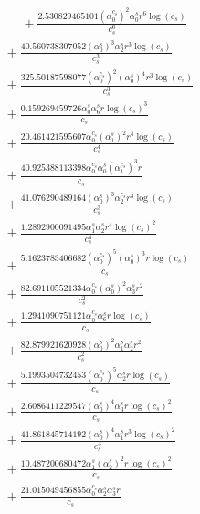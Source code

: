 \documentclass[10pt]{article}
\begin{document}
\begin{align*}
\phantom{R_{3,9}} &\phantom{={}}{}  + \frac{2.530829465101 \left(\alpha_{0}^{c_s}\right)^{2} \alpha_{0}^s r^{6} \log{\left(c_{s} \right)}}{c_{s}^{6}} \\
&{}  + \frac{40.560738307052 \left(\alpha_{0}^s\right)^{3} \alpha_{2}^s r^{3} \log{\left(c_{s} \right)}}{c_{s}^{3}} \\
&{}  + \frac{325.50187598077 \left(\alpha_{0}^{c_s}\right)^{2} \left(\alpha_{0}^s\right)^{4} r^{3} \log{\left(c_{s} \right)}}{c_{s}^{3}} \\
&{}  + \frac{0.159269459726 \alpha_{0}^s \alpha_{6}^s r \log{\left(c_{s} \right)}^{3}}{c_{s}} \\
&{}  + \frac{20.461421595607 \alpha_{0}^{c_s} \left(\alpha_{1}^s\right)^{2} r^{4} \log{\left(c_{s} \right)}}{c_{s}^{4}} \\
&{}  + \frac{40.925388113398 \alpha_{0}^{c_s} \alpha_{0}^s \left(\alpha_{1}^{c_s}\right)^{3} r}{c_{s}} \\
&{}  + \frac{41.076290489164 \left(\alpha_{0}^s\right)^{3} \alpha_{2}^{c_s} r^{3} \log{\left(c_{s} \right)}}{c_{s}^{3}} \\
&{}  + \frac{1.2892900091495 \alpha_{1}^s \alpha_{2}^s r^{4} \log{\left(c_{s} \right)}^{2}}{c_{s}^{4}} \\
&{}  + \frac{5.1623783406682 \left(\alpha_{0}^{c_s}\right)^{5} \left(\alpha_{0}^s\right)^{3} r \log{\left(c_{s} \right)}}{c_{s}} \\
&{}  + \frac{82.691105521334 \alpha_{0}^{c_s} \left(\alpha_{0}^s\right)^{2} \alpha_{3}^s r^{2}}{c_{s}^{2}} \\
&{}  + \frac{1.2941090751121 \alpha_{0}^{c_s} \alpha_{6}^s r \log{\left(c_{s} \right)}}{c_{s}} \\
&{}  + \frac{82.879921620928 \left(\alpha_{0}^s\right)^{2} \alpha_{1}^s \alpha_{2}^s r^{2}}{c_{s}^{2}} \\
&{}  + \frac{5.1993504732453 \left(\alpha_{0}^{c_s}\right)^{5} \alpha_{2}^s r \log{\left(c_{s} \right)}}{c_{s}} \\
&{}  + \frac{2.6086411229547 \left(\alpha_{0}^s\right)^{4} \alpha_{3}^s r \log{\left(c_{s} \right)}^{2}}{c_{s}} \\
&{}  + \frac{41.861845714192 \left(\alpha_{0}^s\right)^{4} \alpha_{1}^s r^{3} \log{\left(c_{s} \right)}^{2}}{c_{s}^{3}} \\
&{}  + \frac{10.487200680472 \alpha_{1}^s \left(\alpha_{2}^s\right)^{2} r \log{\left(c_{s} \right)}^{2}}{c_{s}} \\
&{}  + \frac{21.015049456855 \alpha_{0}^{c_s} \alpha_{2}^s \alpha_{3}^s r}{c_{s}} \\

\end{align*}
\end{document}
